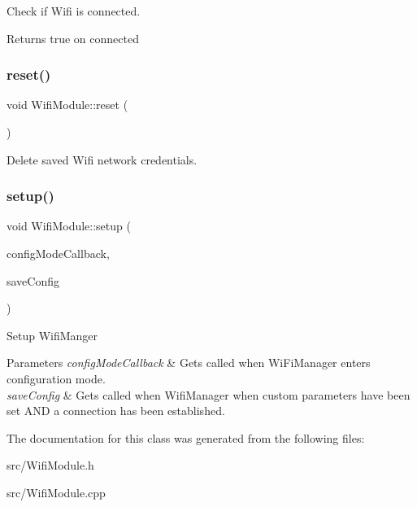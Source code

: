 Check if Wifi is connected. \begin{DoxyReturn}{Returns}
true on connected 
\end{DoxyReturn}
\mbox{\label{class_wifi_module_af03089b54800669d9cc57d3ac8bf3188}} 
\subsubsection{\texorpdfstring{reset()}{reset()}}
{\footnotesize\ttfamily void Wifi\+Module\+::reset (\begin{DoxyParamCaption}{ }\end{DoxyParamCaption})}

Delete saved Wifi network credentials. \mbox{\label{class_wifi_module_a78a8fa5090dc159e070d32c957e661dd}} 
\subsubsection{\texorpdfstring{setup()}{setup()}}
{\footnotesize\ttfamily void Wifi\+Module\+::setup (\begin{DoxyParamCaption}\item[{void($\ast$)(Wi\+Fi\+Manager $\ast$my\+Wi\+Fi\+Manager)}]{config\+Mode\+Callback,  }\item[{void($\ast$)(void)}]{save\+Config }\end{DoxyParamCaption})}

Setup Wifi\+Manger 
\begin{DoxyParams}{Parameters}
{\em config\+Mode\+Callback} & Gets called when Wi\+Fi\+Manager enters configuration mode. \\
\hline
{\em save\+Config} & Gets called when Wifi\+Manager when custom parameters have been set A\+ND a connection has been established. \\
\hline
\end{DoxyParams}


The documentation for this class was generated from the following files\+:\begin{DoxyCompactItemize}
\item 
src/Wifi\+Module.\+h\item 
src/Wifi\+Module.\+cpp\end{DoxyCompactItemize}
